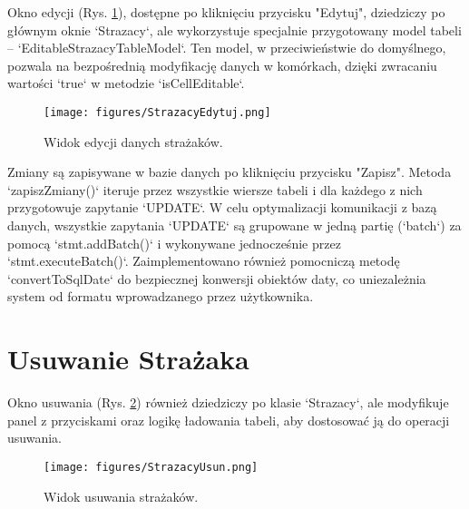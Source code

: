 Okno edycji (Rys. \ref{fig:strazacy_edytuj_widok}), dostępne po kliknięciu przycisku "Edytuj", dziedziczy po głównym oknie `Strazacy`, ale wykorzystuje specjalnie przygotowany model tabeli – `EditableStrazacyTableModel`. Ten model, w przeciwieństwie do domyślnego, pozwala na bezpośrednią modyfikację danych w komórkach, dzięki zwracaniu wartości `true` w metodzie `isCellEditable`.

\begin{figure}[H]
	\centering
	\texttt{[image: figures/StrazacyEdytuj.png]}
	\caption{Widok edycji danych strażaków.}
	\label{fig:strazacy_edytuj_widok}
\end{figure}

Zmiany są zapisywane w bazie danych po kliknięciu przycisku "Zapisz". Metoda `zapiszZmiany()` iteruje przez wszystkie wiersze tabeli i dla każdego z nich przygotowuje zapytanie `UPDATE`. W celu optymalizacji komunikacji z bazą danych, wszystkie zapytania `UPDATE` są grupowane w jedną partię (`batch`) za pomocą `stmt.addBatch()` i wykonywane jednocześnie przez `stmt.executeBatch()`. Zaimplementowano również pomocniczą metodę `convertToSqlDate` do bezpiecznej konwersji obiektów daty, co uniezależnia system od formatu wprowadzanego przez użytkownika.

\section{Usuwanie Strażaka}
\label{sec:strazacy_usuwanie}

Okno usuwania (Rys. \ref{fig:strazacy_usun_widok}) również dziedziczy po klasie `Strazacy`, ale modyfikuje panel z przyciskami oraz logikę ładowania tabeli, aby dostosować ją do operacji usuwania.

\begin{figure}[H]
	\centering
	\texttt{[image: figures/StrazacyUsun.png]}
	\caption{Widok usuwania strażaków.}
	\label{fig:strazacy_usun_widok}
\end{figure}

